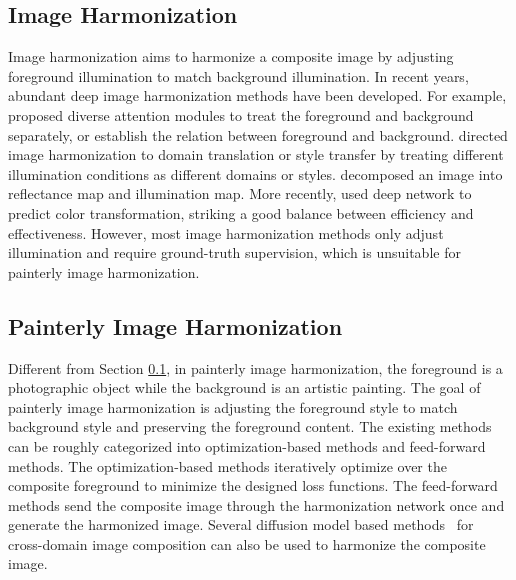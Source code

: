 \documentclass[letterpaper]{article} %
\begin{document}
\subsection{Image Harmonization} \label{sec:image_harmonization}

Image harmonization aims to harmonize a composite image by adjusting foreground illumination to match background illumination.
In recent years, abundant deep image harmonization methods \cite{tsai2017deep,Jiang_2021_ICCV,xing2022composite,peng2022frih,zhu2022image,valanarasu2022interactive,LEMaRT} have been developed. For example, \cite{xiaodong2019improving,Hao2020bmcv,sofiiuk2021foreground} proposed diverse attention modules to treat the foreground and background separately, or establish the relation between foreground and background. \cite{cong2020dovenet,ling2021region,hang2022scs} directed image harmonization to domain translation or style transfer by treating different illumination conditions as different domains or styles.  \cite{guo2021image,guo2021intrinsic,guo2022transformer}  decomposed an image into reflectance map and illumination map.  More recently, \cite{cong2022high,ke2022harmonizer,liang2021spatial,xue2022dccf,PCTNet,WangCVPR2023} used deep network to predict color transformation, striking a good balance between efficiency and effectiveness.
However, most image harmonization methods only adjust illumination and require ground-truth supervision, which is unsuitable for painterly image harmonization.
\subsection{Painterly Image Harmonization}

Different from Section \ref{sec:image_harmonization}, in painterly image harmonization, the foreground is a photographic object while the background is an artistic painting. The goal of painterly image harmonization is adjusting the foreground style to match background style and preserving the foreground content. The existing methods can be roughly categorized into optimization-based methods and feed-forward methods.  The optimization-based methods \cite{luan2018deep,zhang2020deep} iteratively optimize over the composite foreground to minimize the designed loss functions. The feed-forward methods \cite{peng2019element,yan2022style,cao2022painterly} send the composite image through the harmonization network once and generate the harmonized image.
Several diffusion model based methods~\cite{sdedit,cdc} for cross-domain image composition can also be used to harmonize the composite image.
\end{document}
